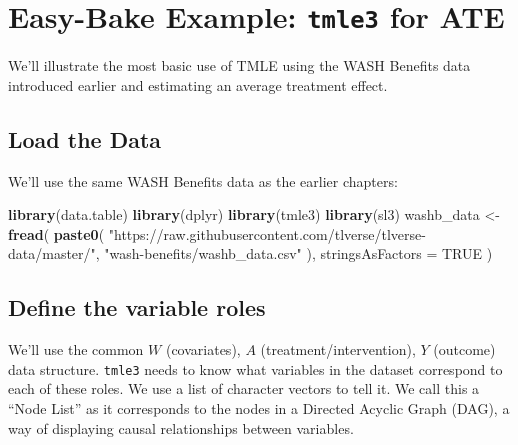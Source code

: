 \documentclass[12pt, krantz2,]{book}
\newenvironment{Shaded}{\begin{snugshade}}{\end{snugshade}}
\newcommand{\DataTypeTok}[1]{\textcolor[rgb]{0.13,0.29,0.53}{#1}}
\newcommand{\KeywordTok}[1]{\textcolor[rgb]{0.13,0.29,0.53}{\textbf{#1}}}
\newcommand{\NormalTok}[1]{#1}
\newcommand{\OtherTok}[1]{\textcolor[rgb]{0.56,0.35,0.01}{#1}}
\newcommand{\StringTok}[1]{\textcolor[rgb]{0.31,0.60,0.02}{#1}}
\theoremstyle{definition}
\theoremstyle{definition}
\theoremstyle{definition}
\newcommand{\1}{\mathbbm{1}}
\begin{document}
\hypertarget{easy-bake-example-tmle3-for-ate}{%
\section{\texorpdfstring{Easy-Bake Example: \texttt{tmle3} for ATE}{Easy-Bake Example: tmle3 for ATE}}\label{easy-bake-example-tmle3-for-ate}}

We'll illustrate the most basic use of TMLE using the WASH Benefits data
introduced earlier and estimating an average treatment effect.

\hypertarget{load-the-data}{%
\subsection{Load the Data}\label{load-the-data}}

We'll use the same WASH Benefits data as the earlier chapters:

\begin{Shaded}
\begin{Highlighting}[]
\KeywordTok{library}\NormalTok{(data.table)}
\KeywordTok{library}\NormalTok{(dplyr)}
\KeywordTok{library}\NormalTok{(tmle3)}
\KeywordTok{library}\NormalTok{(sl3)}
\NormalTok{washb_data <-}\StringTok{ }\KeywordTok{fread}\NormalTok{(}
  \KeywordTok{paste0}\NormalTok{(}
    \StringTok{"https://raw.githubusercontent.com/tlverse/tlverse-data/master/"}\NormalTok{,}
    \StringTok{"wash-benefits/washb_data.csv"}
\NormalTok{  ),}
  \DataTypeTok{stringsAsFactors =} \OtherTok{TRUE}
\NormalTok{)}
\end{Highlighting}
\end{Shaded}

\hypertarget{define-the-variable-roles}{%
\subsection{Define the variable roles}\label{define-the-variable-roles}}

We'll use the common \(W\) (covariates), \(A\) (treatment/intervention), \(Y\)
(outcome) data structure. \texttt{tmle3} needs to know what variables in the dataset
correspond to each of these roles. We use a list of character vectors to tell
it. We call this a ``Node List'' as it corresponds to the nodes in a Directed
Acyclic Graph (DAG), a way of displaying causal relationships between variables.
\end{document}
